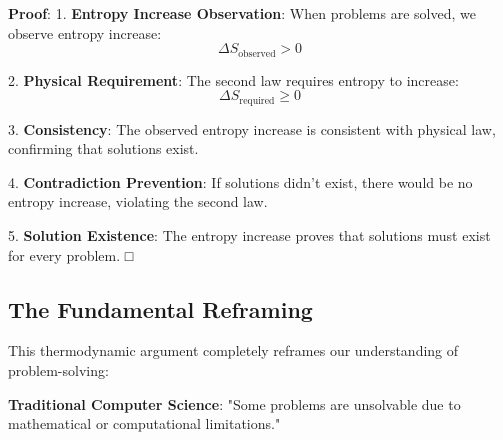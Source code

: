 \documentclass[12pt,a4paper]{article}
\theoremstyle{definition}
\begin{document}
\textbf{Proof}:
1. \textbf{Entropy Increase Observation}: When problems are solved, we observe entropy increase:
   $$\Delta S_{\text{observed}} > 0$$

2. \textbf{Physical Requirement}: The second law requires entropy to increase:
   $$\Delta S_{\text{required}} \geq 0$$

3. \textbf{Consistency}: The observed entropy increase is consistent with physical law, confirming that solutions exist.

4. \textbf{Contradiction Prevention}: If solutions didn't exist, there would be no entropy increase, violating the second law.

5. \textbf{Solution Existence}: The entropy increase proves that solutions must exist for every problem. □

\subsection{The Fundamental Reframing}

This thermodynamic argument completely reframes our understanding of problem-solving:

\textbf{Traditional Computer Science}: "Some problems are unsolvable due to mathematical or computational limitations."
\end{document}
